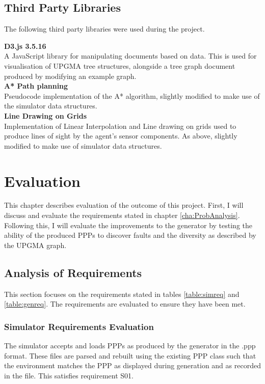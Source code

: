 \documentclass[authoryearcitations]{UoYCSproject}
\begin{document}
\section{Third Party Libraries}
\label{sec:tplibs}
The following third party libraries were used during the project.

\textbf{D3.js 3.5.16 \cite{d3js}}\\
A JavaScript library for manipulating documents based on data. This is used for visualisation of UPGMA tree structures, alongside a tree graph document produced by modifying an example graph.\\

\textbf{A* Path planning \cite{aStar}}\\
Pseudocode implementation of the A* algorithm, slightly modified to make use of the simulator data structures.\\

\textbf{Line Drawing on Grids \cite{lineDrawing}}\\
Implementation of Linear Interpolation and Line drawing on grids used to produce lines of sight by the agent's sensor components. As above, slightly modified to make use of simulator data structures.

\chapter{Evaluation}
\label{cha:Evaluation}
This chapter describes evaluation of the outcome of this project. First, I will discuss and evaluate the requirements stated in chapter \ref{cha:ProbAnalysis}. Following this, I will evaluate the improvements to the generator by testing the ability of the produced PPPs to discover faults and the diversity as described by the UPGMA graph.

\section{Analysis of Requirements}
\label{sec:req_eval}
This section focuses on the requirements stated in tables \ref{table:simreq} and \ref{table:genreq}. The requirements are evaluated to ensure they have been met.

\subsection{Simulator Requirements Evaluation}
\label{sec:sim_req_eval}
The simulator accepts and loads PPPs as produced by the generator in the .ppp format. These files are parsed and rebuilt using the existing PPP class such that the environment matches the PPP as displayed during generation and as recorded in the file. This satisfies requirement S01. 
\end{document}
